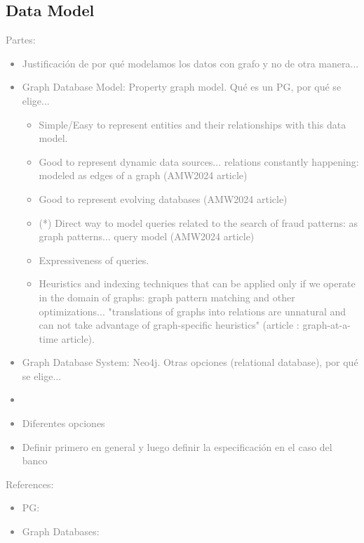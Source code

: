 
\subsection{Data Model}


\textcolor{gray}{Partes:
\begin{itemize}
    \item Justificación de por qué modelamos los datos con grafo y no de otra manera...
    \item Graph Database Model: Property graph model. Qué es un PG, por qué se elige...
    \begin{itemize}
        \item Simple/Easy to represent entities and their relationships with this data model.
        \item Good to represent dynamic data sources... relations constantly happening: modeled as edges of a graph (AMW2024 article)
        \item Good to represent evolving databases (AMW2024 article)
        \item (*) Direct way to model queries related to the search of fraud patterns: as graph patterns... query model (AMW2024 article) 
        \item Expressiveness of queries.
        \item Heuristics and indexing techniques that can be applied only if we operate in the domain of graphs: graph pattern matching and other optimizations... "translations of graphs into relations are unnatural and can not take advantage of graph-specific heuristics" (article \cite{PG-Graphs-at-a-time-GraphQL-QueryLanguage}: graph-at-a-time article).
    \end{itemize}
    \item Graph Database System: Neo4j. Otras opciones (relational database), por qué se elige...
    \item 
    \item Diferentes opciones
    \item Definir primero en general y luego definir la especificación en el caso del banco
\end{itemize}
References:
    \begin{itemize}
        \item PG: \cite{PG-angles2017foundations, PG-angles2018propertyGraphDatabaseModel, PG-Graphs-at-a-time-GraphQL-QueryLanguage, PG-exampleUsageSimeonovski}
        \item Graph Databases: \textcolor{blue}{\cite{GDB-angles2008survey, GDB-kumar2015graph}}
    \end{itemize}
}




